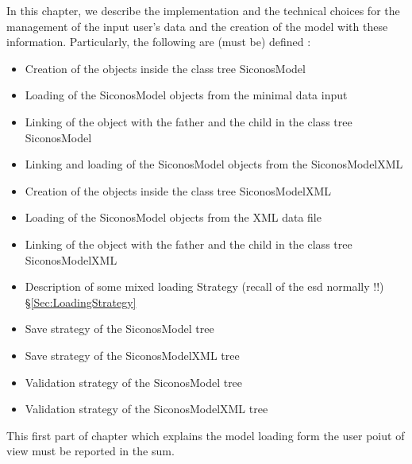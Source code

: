 In this chapter, we describe the implementation and the technical choices for the management of the input user's data and the creation of the model with these information. Particularly, the following are (must be) defined :
\begin{itemize}
\item Creation of the objects inside the class tree SiconosModel
\item Loading of the SiconosModel objects from the minimal data input
\item Linking of the object with the father and the child in the class tree SiconosModel 
\item Linking and loading of the SiconosModel objects from the SiconosModelXML
\item Creation of the objects inside the class tree SiconosModelXML
\item Loading of the SiconosModel objects from the XML data file
\item Linking of the object with the father and the child in the class tree SiconosModelXML
\item Description of some mixed loading Strategy (recall of the \ac{esd} normally !!) \S \ref{Sec:LoadingStrategy}
\item Save strategy of the SiconosModel tree
\item Save strategy of the SiconosModelXML tree
\item Validation strategy of the SiconosModel tree
\item Validation strategy of the SiconosModelXML tree
\end{itemize}


This first  part of chapter which explains  the model loading form the user poiut of view  must be reported in the \ac{sum}. 
